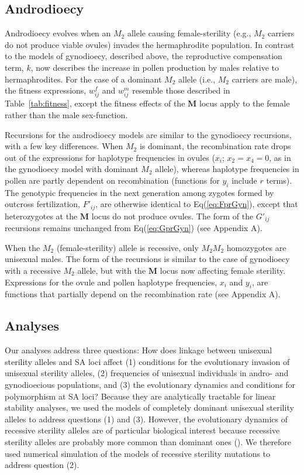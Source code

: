 \documentclass{article}
\begin{document}
\subsection*{Androdioecy}

Androdioecy evolves when an $M_2$ allele causing female-sterility (e.g., $M_2$ carriers do not produce viable ovules) invades the hermaphrodite population. In contrast to the models of gynodioecy, described above, the reproductive compensation term, $k$, now describes the increase in pollen production by males relative to hermaphrodites. For the case of a dominant $M_2$ allele (i.e., $M_2$ carriers are male), the fitness expressions, $w^f_{ij}$ and $w^m_{ij}$ resemble those described in Table~\ref{tab:fitness}, except the fitness effects of the $\mathbf{M}$ locus apply to the female rather than the male sex-function. 

Recursions for the androdioecy models are similar to the gynodioecy recursions, with a few key differences. When $M_2$ is dominant, the recombination rate drops out of the expressions for haplotype frequencies in ovules ($x_i$; $x_2=x_4=0$, as in the gynodioecy model with dominant $M_2$ allele), whereas haplotype frequencies in pollen are partly dependent on recombination (functions for $y_i$ include $r$ terms). The genotypic frequencies in the next generation among zygotes formed by outcross fertilization, $F'_{ij}$, are otherwise identical to Eq(\ref{eq:FprGyn}), except that heterozygotes at the $\mathbf{M}$ locus do not produce ovules. The form of the $G'_{ij}$ recursions remains unchanged from Eq(\ref{eq:GprGyn}) (see Appendix A).

When the $M_2$ (female-sterility) allele is recessive, only $M_2M_2$ homozygotes are unisexual males. The form of the recursions is similar to the case of gynodioecy with a recessive $M_2$ allele, but with the $\mathbf{M}$ locus now affecting female sterility. Expressions for the ovule and pollen haplotype frequencies, $x_i$ and $y_i$, are functions that partially depend on the recombination rate (see Appendix A).


\subsection*{Analyses} \label{subsec:analyses}

Our analyses address three questions: How does linkage between unisexual sterility alleles and SA loci affect (1) conditions for the evolutionary invasion of unisexual sterility alleles, (2) frequencies of unisexual individuals in andro- and gynodioecious populations, and (3) the evolutionary dynamics and conditions for polymorphism at SA loci? Because they are analytically tractable for linear stability analyses, we used the models of completely dominant unisexual sterility alleles to address questions (1) and (3). However, the evolutionary dynamics of recessive sterility alleles are of particular biological interest because recessive sterility alleles are probably more common than dominant ones (\citealt{Charlesworth1978a}). We therefore used numerical simulation of the models of recessive sterility mutations to address question (2). 
\end{document}
